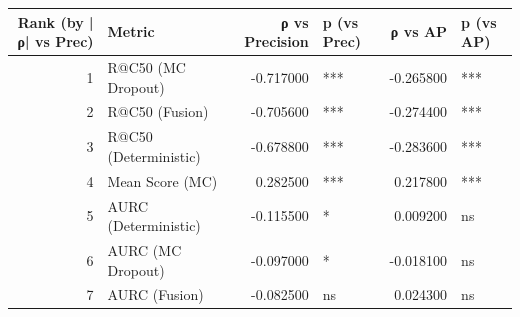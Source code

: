 \begin{tabular}{rlrlrl}
\toprule
Rank (by |ρ| vs Prec) & Metric & ρ vs Precision & p (vs Prec) & ρ vs AP & p (vs AP) \\
\midrule
1 & R@C50 (MC Dropout) & -0.717000 & *** & -0.265800 & *** \\
2 & R@C50 (Fusion) & -0.705600 & *** & -0.274400 & *** \\
3 & R@C50 (Deterministic) & -0.678800 & *** & -0.283600 & *** \\
4 & Mean Score (MC) & 0.282500 & *** & 0.217800 & *** \\
5 & AURC (Deterministic) & -0.115500 & * & 0.009200 & ns \\
6 & AURC (MC Dropout) & -0.097000 & * & -0.018100 & ns \\
7 & AURC (Fusion) & -0.082500 & ns & 0.024300 & ns \\
\bottomrule
\end{tabular}
